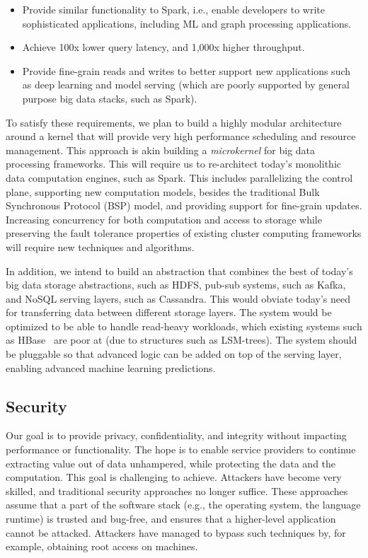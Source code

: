 \begin{itemize}[noitemsep,topsep=0pt,parsep=0pt,partopsep=0pt]
\item Provide similar functionality to Spark, i.e., enable developers to write sophisticated applications, including ML and graph processing applications.
\item Achieve 100x lower query latency, and 1,000x higher throughput.
\item Provide fine-grain reads and writes to better support new applications such as deep learning and model serving (which are poorly supported by general purpose big data stacks, such as Spark).
\end{itemize}

To satisfy these requirements, we plan to build a highly modular architecture around a kernel that will provide very high performance scheduling and resource management. This approach is akin building a {\em microkernel} for big data processing frameworks. This will require us to re-architect today's monolithic data computation engines, such as Spark. This includes parallelizing the control plane, supporting new computation models, besides the traditional Bulk Synchronous Protocol (BSP) model, and providing support for fine-grain updates. Increasing concurrency for both computation and access to storage while preserving the fault tolerance properties of existing cluster computing frameworks will require new techniques and algorithms. 

In addition, we intend to build an abstraction that combines the best of today's big data storage abstractions, such as HDFS, pub-sub systems, such as Kafka, and NoSQL serving layers, such as Cassandra. This would obviate today's need for transferring data between different storage layers. The system would be optimized to be able to handle read-heavy workloads, which existing systems such as HBase~\cite{hbase} are poor at (due to structures such as LSM-trees). The system should be pluggable so that advanced logic can be added on top of the serving layer, enabling advanced machine learning predictions. 

\subsection{Security} 

Our goal is to provide privacy, confidentiality, and integrity without impacting performance or functionality. The hope is to enable service providers to continue extracting value out of data unhampered, while protecting the data and the computation. This goal is challenging to achieve. Attackers have become very skilled, and traditional security approaches no longer suffice. These approaches assume that a part of the software stack (e.g., the operating system, the language runtime) is trusted and bug-free, and ensures that a higher-level application cannot be attacked. Attackers have managed to bypass such techniques by, for example, obtaining root access on machines.

